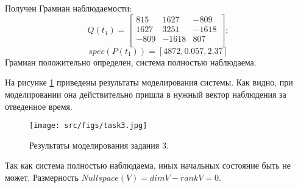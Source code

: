 Получен Грамиан наблюдаемости:
\[
        Q(t_1) = \begin{bmatrix}
        815 & 1627 & -809\\
        1627 & 3251 & -1618 \\
        -809 & -1618 & 807 \\
        \end{bmatrix};
\]
\[
        spec(P(t_1)) = [4872, 0.057, 2.37]
\]Грамиан положительно определен, система полностью наблюдаема.

На рисунке \ref{fig:task3} приведены результаты моделирования системы. Как видно, при моделировании она действительно пришла в нужный вектор наблюдения за отведенное время.
\begin{figure}[ht!]
        \centering
        \texttt{[image: src/figs/task3.jpg]}
        \caption{Результаты моделирования задания 3.}
        \label{fig:task3}
\end{figure}
Так как система полностью наблюдаема, иных начальных состояние быть не может. Размерность \(Nullspace(V) = dimV - rankV = 0\). 
